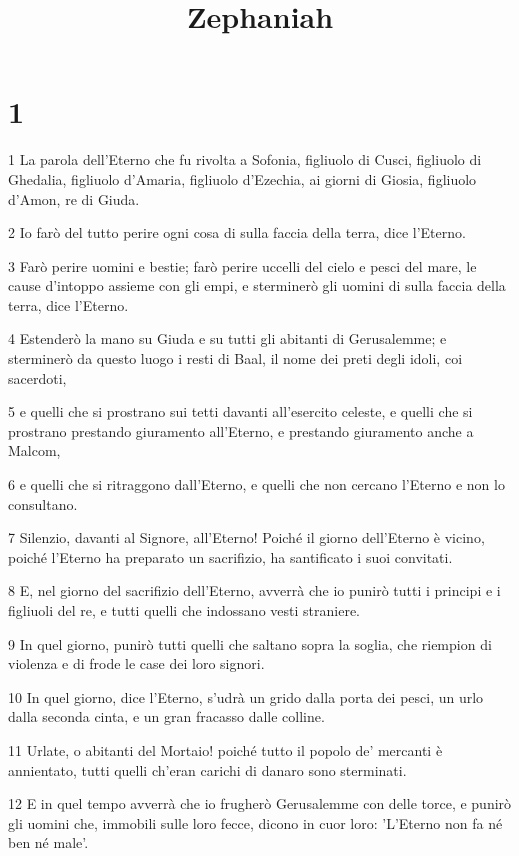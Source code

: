 

\title{Zephaniah}


\chapter{1}

\par 1 La parola dell'Eterno che fu rivolta a Sofonia, figliuolo di Cusci, figliuolo di Ghedalia, figliuolo d'Amaria, figliuolo d'Ezechia, ai giorni di Giosia, figliuolo d'Amon, re di Giuda.
\par 2 Io farò del tutto perire ogni cosa di sulla faccia della terra, dice l'Eterno.
\par 3 Farò perire uomini e bestie; farò perire uccelli del cielo e pesci del mare, le cause d'intoppo assieme con gli empi, e sterminerò gli uomini di sulla faccia della terra, dice l'Eterno.
\par 4 Estenderò la mano su Giuda e su tutti gli abitanti di Gerusalemme; e sterminerò da questo luogo i resti di Baal, il nome dei preti degli idoli, coi sacerdoti,
\par 5 e quelli che si prostrano sui tetti davanti all'esercito celeste, e quelli che si prostrano prestando giuramento all'Eterno, e prestando giuramento anche a Malcom,
\par 6 e quelli che si ritraggono dall'Eterno, e quelli che non cercano l'Eterno e non lo consultano.
\par 7 Silenzio, davanti al Signore, all'Eterno! Poiché il giorno dell'Eterno è vicino, poiché l'Eterno ha preparato un sacrifizio, ha santificato i suoi convitati.
\par 8 E, nel giorno del sacrifizio dell'Eterno, avverrà che io punirò tutti i principi e i figliuoli del re, e tutti quelli che indossano vesti straniere.
\par 9 In quel giorno, punirò tutti quelli che saltano sopra la soglia, che riempion di violenza e di frode le case dei loro signori.
\par 10 In quel giorno, dice l'Eterno, s'udrà un grido dalla porta dei pesci, un urlo dalla seconda cinta, e un gran fracasso dalle colline.
\par 11 Urlate, o abitanti del Mortaio! poiché tutto il popolo de' mercanti è annientato, tutti quelli ch'eran carichi di danaro sono sterminati.
\par 12 E in quel tempo avverrà che io frugherò Gerusalemme con delle torce, e punirò gli uomini che, immobili sulle loro fecce, dicono in cuor loro: 'L'Eterno non fa né ben né male'.
